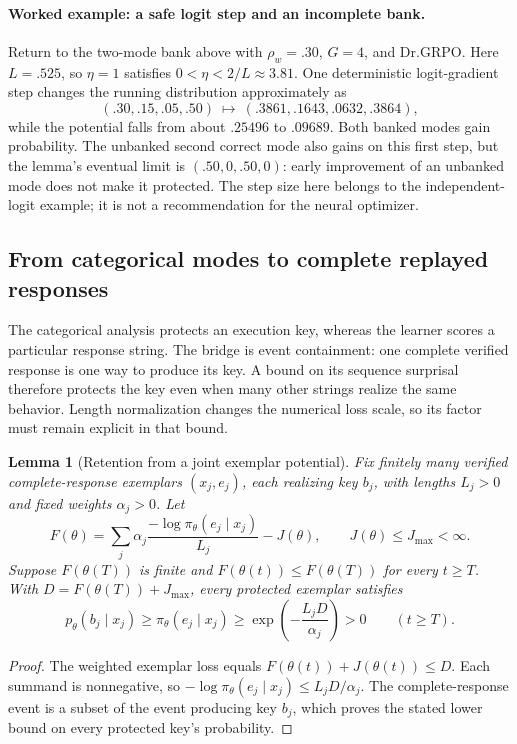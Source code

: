 \documentclass{article}
\newcommand{\1}{\mathbf 1}
\newtheorem{lemma}{Lemma}[section]
\theoremstyle{remark}
\theoremstyle{definition}
\theoremstyle{plain}
\begin{document}
\paragraph{Worked example: a safe logit step and an incomplete bank.}
Return to the two-mode bank above with $\rho_w=.30$, $G=4$, and Dr.GRPO.
Here $L=.525$, so $\eta=1$ satisfies $0<\eta<2/L\approx3.81$.
One deterministic logit-gradient step changes the running distribution
approximately as
\[
 (.30,.15,.05,.50)\ \longmapsto\ (.3861,.1643,.0632,.3864),
\]
while the potential falls from about $.25496$ to $.09689$.
Both banked modes gain probability. The unbanked second correct mode also
gains on this first step, but the lemma's eventual limit is
$(.50,0,.50,0)$: early improvement of an unbanked mode does not make it
protected. The step size here belongs to the independent-logit example;
it is not a recommendation for the neural optimizer.

\subsection{From categorical modes to complete replayed responses}
\label{app:theory-exemplar-bridge}

The categorical analysis protects an execution key, whereas the learner
scores a particular response string. The bridge is event containment: one
complete verified response is one way to produce its key. A bound on its
sequence surprisal therefore protects the key even when many other strings
realize the same behavior. Length normalization changes the numerical loss
scale, so its factor must remain explicit in that bound.

\begin{lemma}[Retention from a joint exemplar potential]
\label{lem:shared-exemplar-retention}
Fix finitely many verified complete-response exemplars $(x_j,e_j)$, each
realizing key $b_j$, with lengths $L_j>0$ and fixed weights $\alpha_j>0$.
Let
\[
 F(\theta)=\sum_j\alpha_j
 \frac{-\log\pi_\theta(e_j\mid x_j)}{L_j}-J(\theta),
 \qquad J(\theta)\le J_{\max}<\infty.
\]
Suppose $F(\theta(T))$ is finite and
$F(\theta(t))\le F(\theta(T))$ for every $t\ge T$. With
$D=F(\theta(T))+J_{\max}$, every protected exemplar satisfies
\[
 p_\theta(b_j\mid x_j)\ge\pi_\theta(e_j\mid x_j)
 \ge\exp\!\left(-\frac{L_jD}{\alpha_j}\right)>0
 \qquad(t\ge T).
\]
\end{lemma}
\begin{proof}
The weighted exemplar loss equals $F(\theta(t))+J(\theta(t))\le D$.
Each summand is nonnegative, so
$-\log\pi_\theta(e_j\mid x_j)\le L_jD/\alpha_j$.
The complete-response event is a subset of the event producing key $b_j$,
which proves the stated lower bound on every protected key's probability.
\end{proof}
\end{document}
